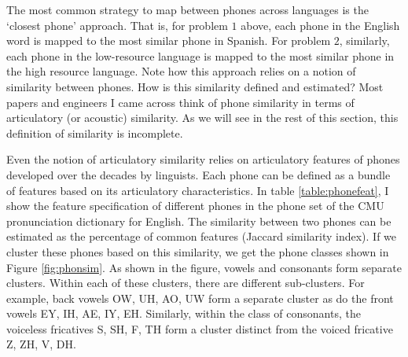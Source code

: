 \documentclass{article}
\begin{document}
The most common strategy to map between phones across languages is the `closest phone' approach. That is, for problem $1$ above, each phone in the English word is mapped to the most similar phone in Spanish. For problem $2$, similarly, each phone in the low-resource language is mapped to the most similar phone in the high resource language. Note how this approach relies on a notion of similarity between phones. How is this similarity defined and estimated? Most papers and engineers I came across think of phone similarity in terms of articulatory (or acoustic) similarity. As we will see in the rest of this section, this definition of similarity is incomplete.

Even the notion of articulatory similarity relies on articulatory features of phones developed over the decades by linguists. Each phone can be defined as a bundle of features based on its articulatory characteristics. In table \ref{table:phonefeat}, I show the feature specification of different phones in the phone set of the CMU pronunciation dictionary for English. The similarity between two phones can be estimated as the percentage of common features (Jaccard similarity index). If we cluster these phones based on this similarity, we get the phone classes shown in Figure \ref{fig:phonsim}. As shown in the figure, vowels and consonants form separate clusters. Within each of these clusters, there are different sub-clusters. For example, back vowels OW, UH, AO, UW form a separate cluster as do the front vowels EY, IH, AE, IY, EH. Similarly, within the class of consonants, the voiceless fricatives S, SH, F, TH form a cluster distinct from the voiced fricative Z, ZH, V, DH. 
\end{document}
